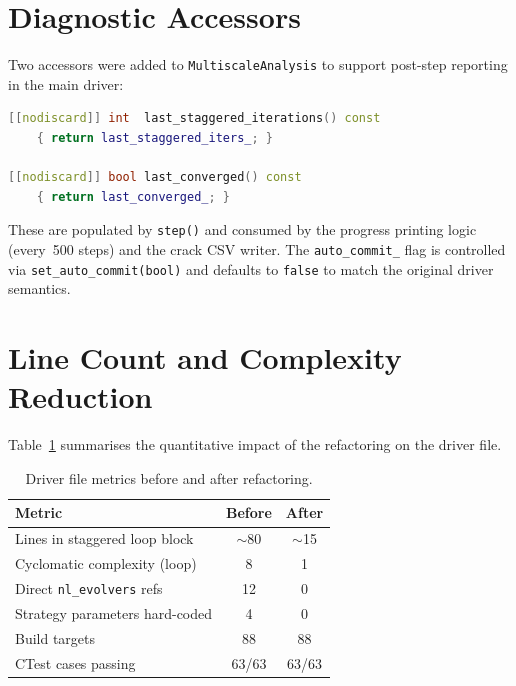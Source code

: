 \section{Diagnostic Accessors}
\label{sec:driver-diagnostics}

Two accessors were added to \texttt{MultiscaleAnalysis} to support
post-step reporting in the main driver:

\begin{lstlisting}[language=C++,caption={Diagnostic accessors on
  MultiscaleAnalysis.},label={lst:driver-diag}]
[[nodiscard]] int  last_staggered_iterations() const
    { return last_staggered_iters_; }

[[nodiscard]] bool last_converged() const
    { return last_converged_; }
\end{lstlisting}

These are populated by \texttt{step()} and consumed by the progress
printing logic (every~500 steps) and the crack CSV writer.  The
\texttt{auto\_commit\_} flag is controlled via
\texttt{set\_auto\_commit(bool)} and defaults to \texttt{false}
to match the original driver semantics.


\section{Line Count and Complexity Reduction}
\label{sec:driver-metrics}

Table~\ref{tab:driver-metrics} summarises the quantitative impact of
the refactoring on the driver file.

\begin{table}[htb]
\centering
\caption{Driver file metrics before and after refactoring.}
\label{tab:driver-metrics}
\begin{tabular}{lcc}
\hline
\textbf{Metric} & \textbf{Before} & \textbf{After} \\
\hline
Lines in staggered loop block       & $\sim$80  & $\sim$15  \\
Cyclomatic complexity (loop)        & 8         & 1         \\
Direct \texttt{nl\_evolvers} refs   & 12        & 0         \\
Strategy parameters hard-coded      & 4         & 0         \\
Build targets                       & 88        & 88        \\
CTest cases passing                 & 63/63     & 63/63     \\
\hline
\end{tabular}
\end{table}

